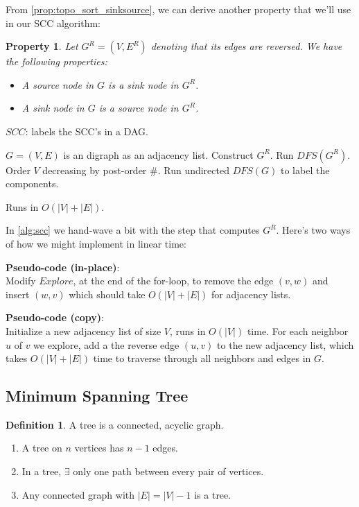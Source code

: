 \documentclass{article}
\newtheorem{property}{Property}[section]
\theoremstyle{definition}
\newtheorem{definition}{Definition}[section]
\begin{document}
From \ref{prop:topo_sort_sinksource}, we can derive another property that we'll use in our SCC algorithm:

\begin{property}
	Let $G^R = (V, E^R)$ denoting that its edges are reversed. We have the following properties:
	\begin{itemize}
		\item A source node in $G$ is a sink node in $G^R$.
		\item A sink node in $G$ is a source node in $G^R$.
	\end{itemize}
\end{property}

\begin{algorithm}
	\caption{$SCC$: labels the SCC's in a DAG.}
	\label{alg:scc}
	\begin{algorithmic}[1]
		\REQUIRE $G=(V,E)$ is an digraph as an adjacency list.
		\STATE Construct $G^R$. 
		\STATE Run \hyperref[alg:dfs_dir]{$DFS(G^R)$}. 
		\STATE Order $V$ decreasing by post-order \#. 
		\STATE Run undirected \hyperref[alg:dfs_und]{$DFS(G)$} to label the components.
	\end{algorithmic}
Runs in $O(|V|+|E|)$.
\end{algorithm}

In \ref{alg:scc} we hand-wave a bit with the step that computes $G^R$. Here's two ways of how we might implement in linear time:

\textbf{Pseudo-code (in-place)}:\\
Modify \hyperref[alg:explore_digraph]{$Explore$}, at the end of the for-loop, to remove the edge $(v,w)$ and insert $(w, v)$ which should take $O(|V| + |E|)$ for adjacency lists.

\textbf{Pseudo-code (copy)}:\\
Initialize a new adjacency list of size $V$, runs in $O(|V|)$ time. For each neighbor $u$ of $v$ we explore, add a the reverse edge $(u, v)$ to the new adjacency list, which takes $O(|V|+|E|)$ time to traverse through all neighbors and edges in $G$.

\subsection{Minimum Spanning Tree}
\begin{definition}
	A tree is a connected, acyclic graph.
	\begin{enumerate}
		\item A tree on $n$ vertices has $n-1$ edges.
		\item In a tree, $\exists$ only one path between every pair of vertices.
		\item Any connected graph with $|E|=|V|-1$ is a tree.
	\end{enumerate}
\end{definition}
\end{document}
